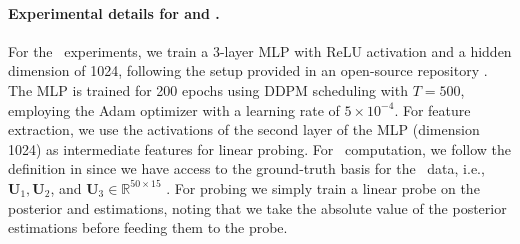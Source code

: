 
\paragraph{Experimental details for  and .}
For the \MoLRG~experiments, we train a 3-layer MLP with ReLU activation and a hidden dimension of 1024, following the setup provided in an open-source repository \citep{tiny_diffusion_repo}. The MLP is trained for 200 epochs using DDPM scheduling with $T=500$, employing the Adam optimizer with a learning rate of $5 \times 10^{-4}$. For feature extraction, we use the activations of the second layer of the MLP (dimension 1024) as intermediate features for linear probing. For \CSNR~computation, we follow the definition in  since we have access to the ground-truth basis for the \MoLRG~data, i.e., $\bm U_1, \bm U_2$, and $\bm U_3\in \mathbb{R}^{50\times 15}$ .  For probing we simply train a linear probe on the posterior and estimations, noting that we take the absolute value of the posterior estimations before feeding them to the probe. 

